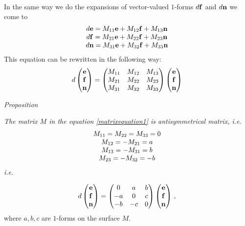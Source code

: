 \documentclass[12pt]{article}
\theoremstyle{theorem}
\numberwithin{equation}{section}
\begin{document}
In the same way we do the expansions of vector-valued $1$-forms $d{\bf f}$ and $d{\bf n}$ we come to
                 \begin{equation*}
                \begin{matrix}
                d{\bf e}=M_{11}{\bf e}+M_{12}{\bf f}+M_{13}{\bf n}\cr
                d{\bf f}=M_{21}{\bf e}+M_{22}{\bf f}+M_{23}{\bf n}\cr
                d{\bf n}=M_{31}{\bf e}+M_{32}{\bf f}+M_{33}{\bf n}\cr
                \end{matrix}
                    \end{equation*}
   This equation can be rewritten in the following way:
                  \begin{equation}\label{matrixequation1}
                       d
                  \begin{pmatrix}
                {\bf e}\cr
                {\bf f}\cr
                {\bf n}\cr
                \end{pmatrix}
                    =
                \begin{pmatrix}
                M_{11} &M_{12} &M_{13}\cr
                M_{21} &M_{22} &M_{23}\cr
                M_{31} &M_{32} &M_{33}\cr
                \end{pmatrix}
                      \begin{pmatrix}
                {\bf e}\cr
                {\bf f}\cr
                {\bf n}\cr
                \end{pmatrix}
                    \end{equation}

       \m

  {\it Proposition} {\it The matrix $M$ in the equation \eqref{matrixequation1} is antisymmetrical matrix, i.e.
                     \begin{equation}
                       \begin{matrix}
                    M_{11}=M_{22}=M_{33}=0\cr
                       M_{12}=-M_{21}=a\cr
                       M_{13}=-M_{31}= b\cr
                       M_{23}=-M_{32}=-b\cr
                       \end{matrix}
                       \end{equation}
i.e.



                      \begin{equation}\label{derivationformulae1}
                    d\begin{pmatrix}
                    {\bf e}\cr{\bf f}\cr{\bf n}\cr
                    \end{pmatrix}=
                    \begin{pmatrix}
                    0&a&b\cr -a&0&c\cr -b&-c&0\cr
                    \end{pmatrix}
                 \begin{pmatrix}
                    {\bf e}\cr{\bf f}\cr{\bf n}\cr
                    \end{pmatrix}\,,
                       \end{equation}
 where $a,b,c$ are $1$-forms on the surface $M$.}
\end{document}
